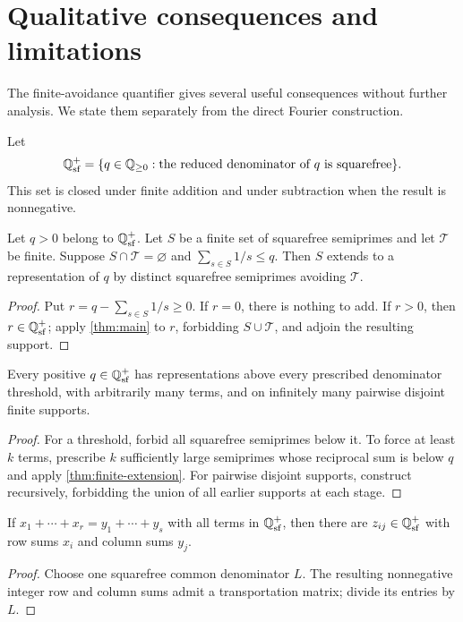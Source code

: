 \section{Qualitative consequences and limitations}
\label{sec:consequences}

The finite-avoidance quantifier gives several useful consequences without further analysis. We state them separately from the direct Fourier construction.

Let
\[
 \mathbb Q_{\rm sf}^+=\{q\in\mathbb Q_{\geq0}:\text{the reduced denominator of $q$ is squarefree}\}.
\]
This set is closed under finite addition and under subtraction when the result is nonnegative.

\begin{theorem}
\label{thm:finite-extension}
Let $q>0$ belong to $\mathbb Q_{\rm sf}^+$. Let $S$ be a finite set of squarefree semiprimes and let $\mathcal T$ be finite. Suppose $S\cap\mathcal T=\varnothing$ and $\sum_{s\in S}1/s\leq q$. Then $S$ extends to a representation of $q$ by distinct squarefree semiprimes avoiding $\mathcal T$.
\end{theorem}
\begin{proof}
Put $r=q-\sum_{s\in S}1/s\geq0$. If $r=0$, there is nothing to add. If $r>0$, then $r\in\mathbb Q_{\rm sf}^+$; apply \cref{thm:main} to $r$, forbidding $S\cup\mathcal T$, and adjoin the resulting support.
\end{proof}

\begin{corollary}
\label{cor:qualitative-flexibility}
Every positive $q\in\mathbb Q_{\rm sf}^+$ has representations above every prescribed denominator threshold, with arbitrarily many terms, and on infinitely many pairwise disjoint finite supports.
\end{corollary}
\begin{proof}
For a threshold, forbid all squarefree semiprimes below it. To force at least $k$ terms, prescribe $k$ sufficiently large semiprimes whose reciprocal sum is below $q$ and apply \cref{thm:finite-extension}. For pairwise disjoint supports, construct recursively, forbidding the union of all earlier supports at each stage.
\end{proof}

\begin{theorem}
\label{thm:squarefree-row-column}
If $x_1+\cdots+x_r=y_1+\cdots+y_s$ with all terms in $\mathbb Q_{\rm sf}^+$, then there are $z_{ij}\in\mathbb Q_{\rm sf}^+$ with row sums $x_i$ and column sums $y_j$.
\end{theorem}
\begin{proof}
Choose one squarefree common denominator $L$. The resulting nonnegative integer row and column sums admit a transportation matrix; divide its entries by $L$.
\end{proof}

